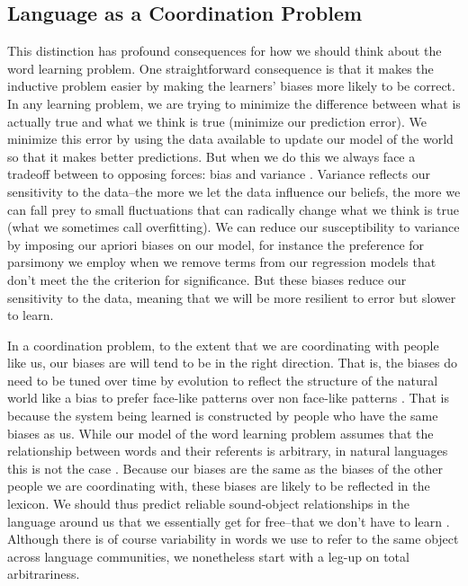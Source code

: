 \documentclass[review]{elsarticle}
\begin{document}
\subsection{Language as a Coordination Problem}

This distinction has profound consequences for how we should think about the word learning problem. One straightforward consequence is that it makes the inductive problem easier by making the learners' biases more likely to be correct. In any learning problem, we are trying to minimize the difference between what is actually true and what we think is true (minimize our prediction error). We minimize this error by using the data available to update our model of the world so that it makes better predictions. But when we do this we always face a tradeoff between to opposing forces: bias and variance \cite{hastie2009}. Variance reflects our sensitivity to the data--the more we let the data influence our beliefs, the more we can fall prey to small fluctuations that can radically change what we think is true (what we sometimes call overfitting). We can reduce our susceptibility to variance by imposing our apriori biases on our model, for instance the preference for parsimony we employ when we remove terms from our regression models that don't meet the the criterion for significance. But these biases reduce our sensitivity to the data, meaning that we will be more resilient to error but slower to learn.

In a coordination problem, to the extent that we are coordinating with people like us, our biases are will tend to be in the right direction. That is, the biases do need to be tuned over time by evolution to reflect the structure of the natural world like a bias to prefer face-like patterns over non face-like patterns \citep{johnson1991}. That is because the system being learned is constructed by people who have the same biases as us. While our model of the word learning problem assumes that the relationship between words and their referents is arbitrary, in natural languages this is not the case \citep{saussure1960}. Because our biases are the same as the biases of the other people we are coordinating with, these biases are likely to be reflected in the lexicon. We should thus predict reliable sound-object relationships in the language around us that we essentially get for free--that we don't have to learn \citep{lewis2016,maurer2006,perry2015}. Although there is of course variability in words we use to refer to the same object across language communities, we nonetheless start with a leg-up on total arbitrariness.  
\end{document}
